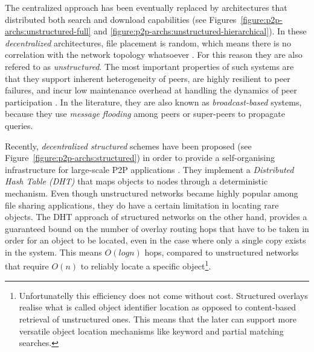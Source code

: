 The centralized approach has been eventually replaced by architectures that
distributed both search and download capabilities (see
Figures~\ref{figure:p2p-archs:unstructured-full} and
\ref{figure:p2p-archs:unstructured-hierarchical}). In these \emph{decentralized}
architectures, file placement is random, which means there is no correlation
with the network topology whatsoever \cite{yang_improvep2psearch_2002}. For this
reason they are also refered to as \emph{unstructured}. The most important
properties of such systems are that they support inherent heterogeneity of
peers, are highly resilient to peer failures, and incur low maintenance overhead
at handling the dynamics of peer participation \cite{stutzbach_churn_2006}. In
the literature, they are also known as \emph{broadcast-based} systems, because
they use \emph{message flooding} among peers or super-peers to propagate
queries.


Recently, \emph{decentralized structured} schemes have been proposed (see
Figure~\ref{figure:p2p-archs:structured}) in order to provide a self-organising
infrastructure for large-scale P2P applications
\cite{ratnasamy_can_2001,stoica_chord_2001,antony_pastry_2001,zhao_tapestry_2001,maymounkov_kademlia_2002,rgrk_bamboo_2004}.
They implement a \emph{Distributed Hash Table (DHT)} that maps objects to nodes
through a deterministic mechanism. Even though unstructured networks became
highly popular among file sharing applications, they do have a certain
limitation in locating rare objects. The DHT approach of structured networks on
the other hand, provides a guaranteed bound on the number of overlay routing
hops that have to be taken in order for an object to be located, even in the
case where only a single copy exists in the system.  This means
$O \left ( log n \right )$ hops, compared to unstructured networks that require
$O \left ( n \right )$ to reliably locate a specific object\footnote{
  Unfortunatelly this efficiency does not come without cost. Structured overlays
  realise what is called object identifier location as opposed to content-based
  retrieval of unstructured ones. This means that the later can support more
  versatile object location mechanisms like keyword and partial matching
  searches.}.

